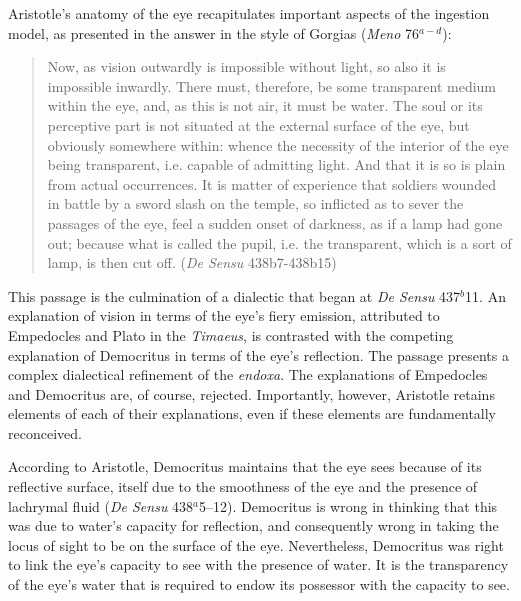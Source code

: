 Aristotle's anatomy of the eye recapitulates important aspects of the ingestion model, as presented in the answer in the style of Gorgias (\emph{Meno} 76\( ^{a-d} \)):
\begin{quote}
	Now, as vision outwardly is impossible without light, so also it is impossible inwardly. There must, therefore, be some transparent medium within the eye, and, as this is not air, it must be water. The soul or its perceptive part is not situated at the external surface of the eye, but obviously somewhere within: whence the necessity of the interior of the eye being transparent, i.e. capable of admitting light. And that it is so is plain from actual occurrences. It is matter of experience that soldiers wounded in battle by a sword slash on the temple, so inflicted as to sever the passages of the eye, feel a sudden onset of darkness, as if a lamp had gone out; because what is called the pupil, i.e. the transparent, which is a sort of lamp, is then cut off. (\emph{De Sensu} 438b7-438b15)
\end{quote}
This passage is the culmination of a dialectic that began at \emph{De Sensu} 437\( ^{b} \)11. An explanation of vision in terms of the eye's fiery emission, attributed to Empedocles and Plato in the \emph{Timaeus}, is contrasted with the competing explanation of Democritus in terms of the eye's reflection. The passage presents a complex dialectical refinement of the \emph{endoxa}. The explanations of Empedocles and Democritus are, of course, rejected. Importantly, however, Aristotle retains elements of each of their explanations, even if these elements are fundamentally reconceived.

According to Aristotle, Democritus maintains that the eye sees because of its reflective surface, itself due to the smoothness of the eye and the presence of lachrymal fluid (\emph{De Sensu} 438\( ^{a} \)5--12). Democritus is wrong in thinking that this was due to water's capacity for reflection, and consequently wrong in taking the locus of sight to be on the surface of the eye. Nevertheless, Democritus was right to link the eye's capacity to see with the presence of water. It is the transparency of the eye's water that is required to endow its possessor with the capacity to see. 


